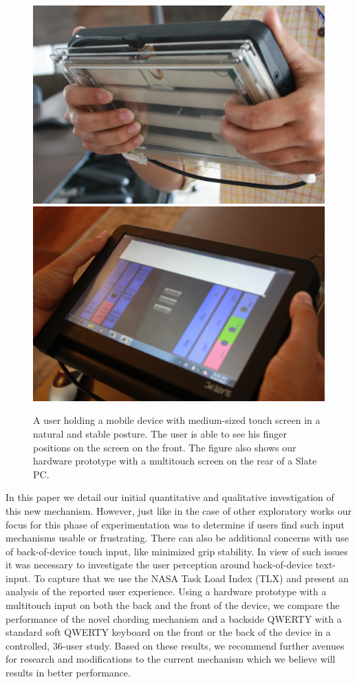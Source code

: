\begin{figure}
    \includegraphics[scale=0.43]{Figures/natural1.pdf} 
     \includegraphics[scale=0.43]{Figures/natural2.pdf} 
     \caption{A user holding a mobile device with medium-sized touch
       screen in a natural and stable posture. The user is able to see
       his finger positions on the screen on the front. The figure
       also shows our hardware prototype with a multitouch screen on
       the rear of a Slate PC.}
        \label{fig:natural}
\end{figure}

In this paper we detail our initial quantitative and qualitative investigation of this new mechanism. However, just like in the case of other exploratory works  our focus for this phase of experimentation was to determine if users find such input mechanisms usable or frustrating. There can also be additional concerns with use of back-of-device touch input, like minimized grip stability. In view of such issues it was necessary to investigate the user perception around back-of-device text-input. To capture that we use the NASA Task Load Index (TLX) and present an analysis of the reported user experience. Using a hardware prototype with a multitouch input on both the back and the front of the device, we compare the performance of the novel chording mechanism and a backside QWERTY with a standard soft QWERTY keyboard on the front or the back of the device in a controlled, 36-user study.  Based on these results, we recommend further avenues for research and modifications to the current mechanism which we believe will results in better performance.
